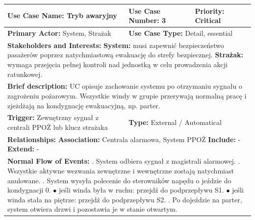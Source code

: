 \documentclass[12pt,a4paper]{article}
\begin{document}
\begin{table}[h!]
\centering
\begin{tabular}{|p{}|p{}|p{}|}
\hline
\textbf{Use Case Name:} Tryb awaryjny & \textbf{Use Case Number:} 3 & \textbf{Priority:} Critical \\ \hline
\textbf{Primary Actor:} System, Strażak & \multicolumn{2}{l|}{\textbf{Use Case Type:} Detail, essential} \\ \hline
\multicolumn{3}{|p{0.9\textwidth}|}{\textbf{Stakeholders and Interests:} \newline
\textbf{System:} musi zapewnić bezpieczeństwo pasażerów poprzez natychmiastową ewakuację do strefy bezpiecznej. \newline
\textbf{Strażak:} wymaga przejęcia pełnej kontroli nad jednostką w celu prowadzenia akcji ratunkowej.} \\ \hline
\multicolumn{3}{|p{0.9\textwidth}|}{\textbf{Brief description:} UC opisuje zachowanie systemu po otrzymaniu sygnału o zagrożeniu pożarowym. Wszystkie windy w grupie przerywają normalną pracę i zjeżdżają na kondygnację ewakuacyjną, np. parter.} \\ \hline
\textbf{Trigger:} Zewnętrzny sygnał z centrali PPOŻ lub klucz strażaka & \multicolumn{2}{l|}{\textbf{Type:} External / Automatical} \\ \hline
\multicolumn{3}{|p{0.9\textwidth}|}{\textbf{Relationships:} \newline
\textbf{Association:} Centrala alarmowa, System PPOŻ \newline
\textbf{Include:} - \newline
\textbf{Extend:} -} \\ \hline
\multicolumn{3}{|p{0.9\textwidth}|}{\textbf{Normal Flow of Events:} \newline
1. System odbiera sygnał z magistrali alarmowej. \newline
2. Wszystkie aktywne wezwania zewnętrzne i wewnętrzne zostają natychmiast anulowane. \newline
3. System wysyła polecenie do sterowników napędu o jeździe do kondygnacji 0. \newline
\hspace*{10pt} $\bullet$ jeśli winda była w ruchu: przejdź do podprzepływu S1. \newline
\hspace*{10pt} $\bullet$ jeśli winda stała na piętrze: przejdź do podprzepływu S2. \newline
4. Po dojeździe na parter, system otwiera drzwi i pozostawia je w stanie otwartym. \newline
}
\end{tabular}
\end{table}
\end{document}
